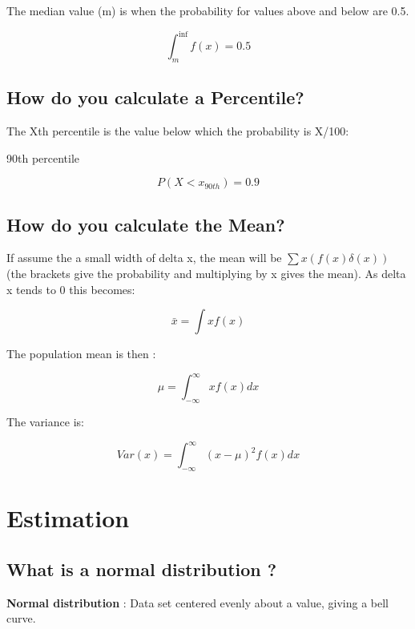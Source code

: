 \documentclass[11pt]{scrartcl} %
\begin{document}
The median value (m) is when the probability for values above and below
are 0.5.

\begin{equation}
	\int_{m}^{\inf} f(x) = 0.5
\end{equation}

\subsection{How do you calculate a
Percentile?}

The Xth percentile is the value below which the probability is X/100:

90th percentile

\begin{equation}
	P(X<x_{90th}) = 0.9
\end{equation}

\subsection{How do you calculate the
Mean?}

If assume the a small width of delta x, the mean will be
\(\sum x(f(x)\delta(x))\) (the brackets give the probability and
multiplying by x gives the mean). As delta x tends to 0 this becomes:

\begin{equation}
	\bar{x} = \int xf(x)
\end{equation}

The population mean is then :

\begin{equation}
	\mu = \int_{-\infty}^{\infty} xf(x) dx
\end{equation}

The variance is:

\begin{equation}
	Var(x) = \int_{-\infty}^{\infty} (x -\mu)^2 f(x) dx
\end{equation}

\section{Estimation}

\subsection{What is a normal distribution
?}

\textbf{Normal distribution} : Data set centered evenly about a value,
giving a bell curve.
\end{document}
